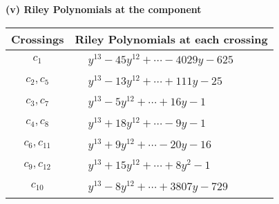 \documentclass[1p]{elsarticle_modified}
\theoremstyle{definition}
\begin{document}
\newpage\renewcommand{\arraystretch}{1}
\flushleft \textbf{(v) Riley Polynomials at the component}\newline \\
\begin{tabular}{m{50pt}|m{274pt}}
Crossings & \hspace{64pt}Riley Polynomials at each crossing \\
\hline $$\begin{aligned}c_{1}\end{aligned}$$&$\begin{aligned}
&y^{13}-45 y^{12}+\cdots-4029 y-625
\end{aligned}$\\
\hline $$\begin{aligned}c_{2},c_{5}\end{aligned}$$&$\begin{aligned}
&y^{13}-13 y^{12}+\cdots+111 y-25
\end{aligned}$\\
\hline $$\begin{aligned}c_{3},c_{7}\end{aligned}$$&$\begin{aligned}
&y^{13}-5 y^{12}+\cdots+16 y-1
\end{aligned}$\\
\hline $$\begin{aligned}c_{4},c_{8}\end{aligned}$$&$\begin{aligned}
&y^{13}+18 y^{12}+\cdots-9 y-1
\end{aligned}$\\
\hline $$\begin{aligned}c_{6},c_{11}\end{aligned}$$&$\begin{aligned}
&y^{13}+9 y^{12}+\cdots-20 y-16
\end{aligned}$\\
\hline $$\begin{aligned}c_{9},c_{12}\end{aligned}$$&$\begin{aligned}
&y^{13}+15 y^{12}+\cdots+8 y^2-1
\end{aligned}$\\
\hline $$\begin{aligned}c_{10}\end{aligned}$$&$\begin{aligned}
&y^{13}-8 y^{12}+\cdots+3807 y-729
\end{aligned}$\\
\hline
\end{tabular}\\~\\
\end{document}
